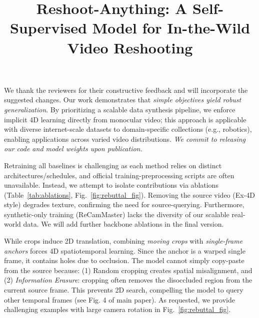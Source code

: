 \documentclass[10pt,twocolumn,letterpaper]{article}
\newcommand{\fv}[1]{{\color{Red}\textbf{#1}}}   %
\begin{document}
\title{\vspace{-0.55cm}Reshoot-Anything: A Self-Supervised Model for In-the-Wild Video Reshooting\vspace{-0.45cm}} 

\maketitle
\thispagestyle{empty}
\appendix

\noindent We thank the reviewers for their constructive feedback and will incorporate the suggested changes. Our work demonstrates that \textit{simple objectives yield robust generalization}. By prioritizing a scalable data synthesis pipeline, we enforce implicit 4D learning directly from monocular video; this approach is applicable with diverse internet-scale datasets to domain-specific collections (e.g., robotics), enabling applications across varied video distributions. \textit{We commit to releasing our code and model weights upon publication.}


% 
\noindent \fv{R1Q1-Backbone}
Retraining all baselines is challenging as each method relies on distinct architectures/schedules, and official training-preprocessing scripts are often unavailable. Instead, we attempt to isolate contributions via ablations (Table~\ref{tab:ablations}, Fig.~\ref{fig:rebuttal_fig}). Removing the source video (Ex-4D style) degrades texture, confirming the need for source-querying. Furthermore, synthetic-only training (ReCamMaster) lacks the diversity of our scalable real-world data. We will add further backbone ablations in the final version.


\noindent \fv{R1Q2-Rotation}
While crops induce 2D translation, combining \textit{moving crops} with \textit{single-frame anchors} forces 4D spatiotemporal learning. Since the anchor is a warped single frame, it contains holes due to occlusion. The model cannot simply copy-paste from the source because: (1) Random cropping creates spatial misalignment, and (2) \textit{Information Erasure}: cropping often removes the disoccluded region from the current source frame. This prevents 2D search, compelling the model to query other temporal frames (see Fig. 4 of main paper). As requested, we provide challenging examples with large camera rotation in Fig.~\ref{fig:rebuttal_fig}.
\end{document}
